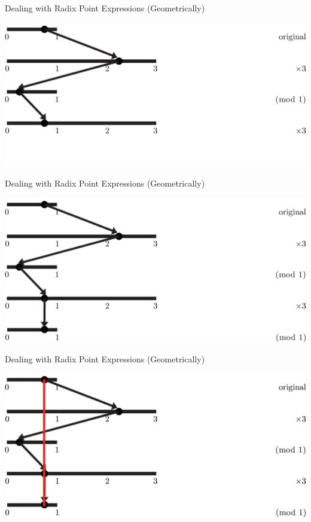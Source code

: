 \documentclass{beamer}
\begin{document}
\begin{frame}{Dealing with Radix Point Expressions (Geometrically)}
  \addtocounter{framenumber}{-1}
  \begin{example}
    \includegraphics[width=\textwidth,height=0.75\textheight]{images/Ternary/4}
  \end{example}
\end{frame}

\begin{frame}{Dealing with Radix Point Expressions (Geometrically)}
  \addtocounter{framenumber}{-1}
  \begin{example}
    \includegraphics[width=\textwidth,height=0.75\textheight]{images/Ternary/5}
  \end{example}
\end{frame}

\begin{frame}{Dealing with Radix Point Expressions (Geometrically)}
  \addtocounter{framenumber}{-1}
  \begin{example}
    \includegraphics[width=\textwidth,height=0.75\textheight]{images/Ternary/6}
  \end{example}
\end{frame}
\end{document}
